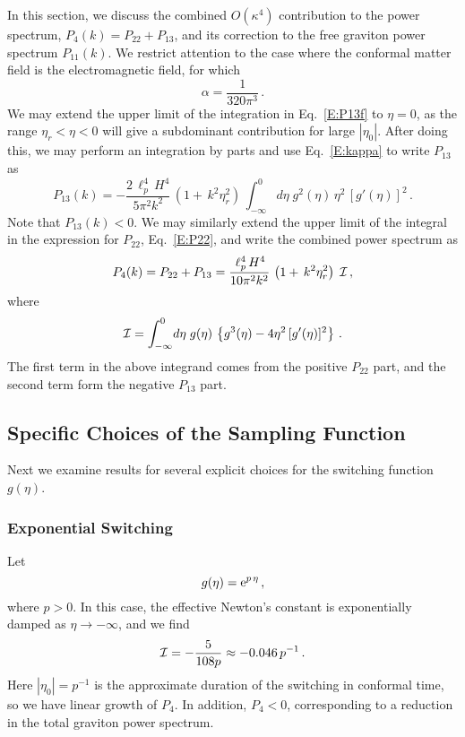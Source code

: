 \documentclass[preprint,prd,showpacs,superscriptaddress]{revtex4}
\begin{document}
In this section, we discuss the combined $O(\kappa^4)$ contribution to the power spectrum, $P_4 (k)= P_{22} + P_{13}$, and its correction 
to the free graviton power spectrum $P_{11}(k)$. We restrict attention to the case where the conformal matter field is the 
electromagnetic field, for which
 \begin{equation}
\alpha = \frac{1}{320 \pi^3} \,.
\end{equation}
We may extend the upper limit of the integration in Eq.~\eqref{E:P13f} to $\eta =0$, as the range $\eta_r <\eta <0$ will give a subdominant
contribution for large $|\eta_0|$. After doing this, we may perform an integration by parts and use Eq.~\eqref{E:kappa} to write $P_{13}$ as
 \begin{equation}
P_{13}(k) = -\frac{2\,\ell_p^4\, H^4}{5 \pi^2 k^2} \, \left(1+ \,k^2 \eta_r^2 \right)\,
 \int_{-\infty}^{0}\!d\eta \;g^{2}(\eta)\, \eta^2\, [g'(\eta)]^2  \,.
  \label{P13f2}
\end{equation}
Note that $P_{13}(k) < 0$.
 We may similarly extend the upper limit of the integral in the expression for $P_{22}$, Eq.~\eqref{E:P22}, and write the combined
 power spectrum as
 \begin{equation}
P_4(k) =  P_{22} + P_{13} = \frac{\,\ell_p^4\, H^4}{10 \pi^2 k^2} \, \left(1+ \,k^2 \eta_r^2 \right)\; {\cal I}  \,,
\end{equation}
 where 
\begin{equation}
{\cal I}  =  \int_{-\infty}^{0}\!d\eta \;g(\eta)\, \left\{ g^3(\eta) -4 \eta^2\, [g'(\eta)]^2 \right\} \,.
\end{equation} 
The first term in the above integrand comes from the positive $P_{22}$ part, and the second term form the negative $P_{13}$ part.
 
 
 \subsection{ Specific Choices of the Sampling Function}
 \label{sec:choices}
 
 Next we examine results for several explicit choices for the switching function $g(\eta)$.
 
 \subsubsection{Exponential Switching}
 
 Let
 \begin{equation}
g(\eta) = {\rm e}^{p\, \eta}\,,
\label{E:exp-switch}
\end{equation}
where $p>0$. In this case, the effective Newton's constant is exponentially damped as $\eta \rightarrow - \infty$, and we
find
\begin{equation}
{\cal I}  =-\frac{5}{108p} \approx -0.046\, p^{-1}\,.
\label{E:I-exp}
\end{equation}
 Here $|\eta_0| = p^{-1}$ is the approximate duration of the switching in conformal time, so we have linear growth
 of $P_4$. In addition, $P_4 < 0$, corresponding to a reduction in the total graviton power spectrum.  
 
\end{document}
